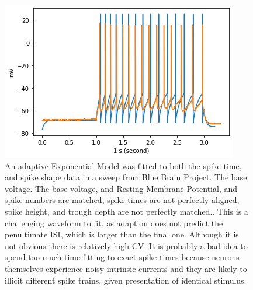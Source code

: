 

\begin{figure}
    \centering
    \includegraphics[scale=0.75]{figures/bbp_multispiking_fit.png}
    \caption{An adaptive Exponential Model was fitted to both the spike time, and spike shape data in a sweep from Blue Brain Project. The base voltage. The base voltage, and Resting Membrane Potential, and spike numbers are matched, spike times are not perfectly aligned, spike height, and trough depth are not perfectly matched.. This is a challenging waveform to fit, as adaption does not predict the penultimate ISI, which is larger than the final one. Although it is not obvious there is relatively high CV. It is probably a bad idea to spend too much time fitting to exact spike times because neurons themselves experience noisy intrinsic currents and they are likely to illicit different spike trains, given presentation of identical stimulus.}
    \label{fig:B95Adexp}
\end{figure}

